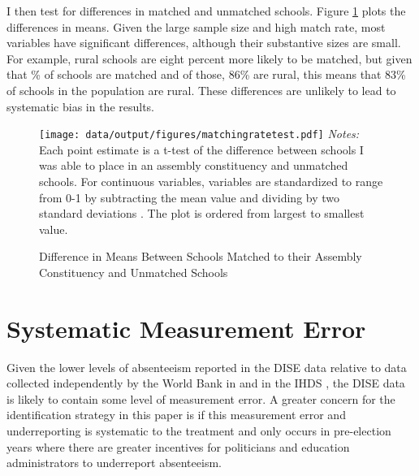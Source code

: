 \documentclass[hidelinks, 12pt, article, oneside]{memoir}
\begin{document}
I then test for differences in matched and unmatched schools.  Figure \ref{appendixfig:matchingratetest} plots the differences in means. Given the large sample size and high match rate, most variables have significant differences, although their substantive sizes are small.  For example, rural schools are eight percent more likely to be matched, but given that \% of schools are matched and of those, 86\% are rural, this means that 83\% of schools in the population are rural.  These differences are unlikely to lead to systematic bias in the results.

\begin{figure}[htbp]
\caption{Difference in Means Between Schools Matched to their Assembly Constituency and Unmatched Schools\label{appendixfig:matchingratetest}}
\centering
\begin{minipage}{6.5in}
    \texttt{[image: data/output/figures/matchingratetest.pdf]}
    \tiny
    \emph{Notes:} Each point estimate is a t-test of the difference between schools I was able to place in an assembly constituency and unmatched schools.  For continuous variables, variables are standardized to range from 0-1 by subtracting the mean value and dividing by two standard deviations \citep{Gelman2008a}. The plot is ordered from largest to smallest value.
\end{minipage}
\end{figure}

\clearpage

\section{Systematic Measurement Error}

Given the lower levels of absenteeism reported in the DISE data relative to data collected independently by the World Bank in \cite{Chaudhury2006} and in the IHDS \citep{Desai2015}, the DISE data is likely to contain some level of measurement error. A greater concern for the identification strategy in this paper is if this measurement error and underreporting is systematic to the treatment and only occurs in pre-election years where there are greater incentives for politicians and education administrators to underreport absenteeism.
\end{document}
